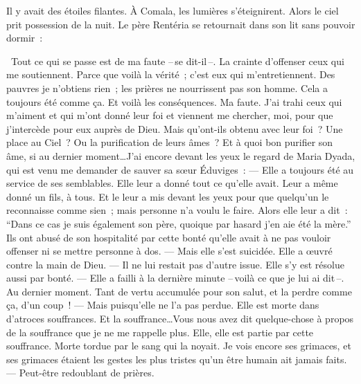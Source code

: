   Il y avait des étoiles filantes. À Comala, les lumières s'éteignirent.
\pend
%
\pstart
  Alors le ciel prit possession de la nuit.
\pend
%
\pstart
  Le père Rentéria se retournait dans son lit sans pouvoir dormir :

  \og{} Tout ce qui se passe est de ma faute --\,se dit-il\,--. La crainte d’offenser ceux qui me soutiennent. Parce que voilà la vérité ; c'est eux qui m’entretiennent. Des pauvres je n’obtiens rien ; les prières ne nourrissent pas son homme. Cela a toujours été comme ça. Et voilà les conséquences. Ma faute. J’ai trahi ceux qui m’aiment et qui m’ont donné leur foi et viennent me chercher, moi, pour que j’intercède pour eux auprès de Dieu. Mais qu’ont-ils obtenu avec leur foi ? Une place au Ciel ? Ou la purification de leurs âmes ? Et à quoi bon purifier son âme, si au dernier moment\ldots J’ai encore devant les yeux le regard de Maria Dyada, qui est venu me demander de sauver sa sœur Éduviges :
\pend
%
\pstart
  \guillemotright --- Elle a toujours été au service de ses semblables. Elle leur a donné tout ce qu’elle avait. Leur a même donné un fils, à tous. Et le leur a mis devant les yeux pour que quelqu’un le reconnaisse comme sien ; mais personne n’a voulu le faire. Alors elle leur a dit : ``Dans ce cas je suis également son père, quoique par hasard j’en aie été la mère.'' Ils ont abusé de son hospitalité par cette bonté qu’elle avait à ne pas vouloir offenser ni se mettre personne à dos.
\pend
%
\pstart
  \guillemotright --- Mais elle s’est suicidée. Elle a œuvré contre la main de Dieu.
\pend
%
\pstart
  \guillemotright --- Il ne lui restait pas d’autre issue. Elle s’y est résolue aussi par bonté.
\pend
%
\pstart
  \guillemotright --- Elle a failli à la dernière minute --\,voilà ce que je lui ai dit\,--. Au dernier moment. Tant de vertu accumulée pour son salut, et la perdre comme ça, d'un coup !
\pend
%
\pstart
  \guillemotright --- Mais puisqu’elle ne l’a pas perdue. Elle est morte dans d’atroces souffrances. Et la souffrance\ldots Vous nous avez dit quelque-chose à propos de la souffrance que je ne me rappelle plus. Elle, elle est partie par cette souffrance. Morte tordue par le sang qui la noyait. Je vois encore ses grimaces, et ses grimaces étaient les gestes les plus tristes qu’un être humain ait jamais faits.
\pend
%
\pstart
  \guillemotright --- Peut-être redoublant de prières.
